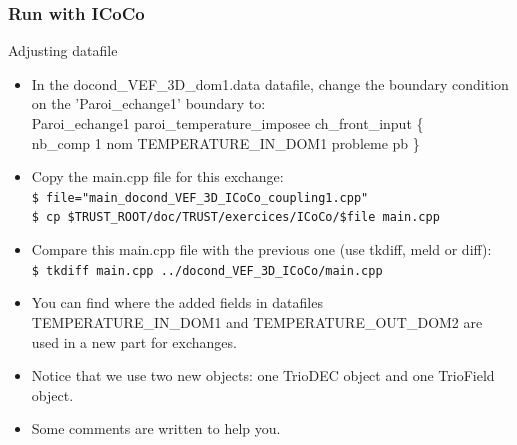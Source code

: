 \documentclass[10pt, hyperref={unicode=true,pdfusetitle, bookmarks=true,bookmarksnumbered=false,bookmarksopen=false, breaklinks=false,pdfborder={0 0 1},backref=true,colorlinks=true,linkcolor=darkblue,pageanchor, urlcolor=darkblue}]{beamer}
\begin{document}
\begin{frame}
\frametitle{Run with ICoCo}

\begin{block}{Adjusting datafile}
\begin{itemize}
\item In the docond\_VEF\_3D\_dom1.data datafile, change the boundary condition on the 'Paroi\_echange1' boundary to:\\
Paroi\_echange1 paroi\_temperature\_imposee ch\_front\_input \{ \\ nb\_comp 1 nom TEMPERATURE\_IN\_DOM1 probleme pb \}
\item Copy the main.cpp file for this exchange:\\
\texttt{\$ file="main\_docond\_VEF\_3D\_ICoCo\_coupling1.cpp"} \\
\texttt{\$ cp \$TRUST\_ROOT/doc/TRUST/exercices/ICoCo/\$file main.cpp }
\item Compare this main.cpp file with the previous one (use tkdiff, meld or diff):\\
\texttt{\$ tkdiff main.cpp ../docond\_VEF\_3D\_ICoCo/main.cpp }
\item You can find where the added fields in datafiles TEMPERATURE\_IN\_DOM1 and TEMPERATURE\_OUT\_DOM2 are used in a new part for exchanges.
\item Notice that we use two new objects: one TrioDEC object and one TrioField object.
\item Some comments are written to help you.
\end{itemize}
\end{block}

\end{frame}
\end{document}
